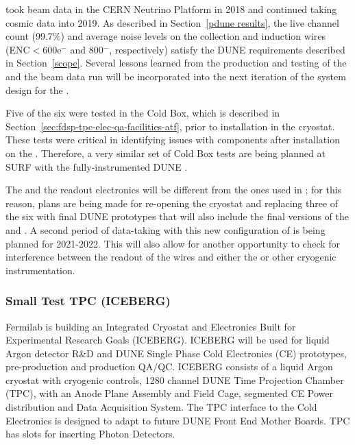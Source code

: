  took beam data in the CERN Neutrino Platform in 2018 and continued taking cosmic data 
into 2019. As described in Section~\ref{pdune results}, the live channel count (99.7\%) and average noise
levels on the collection and induction wires (ENC$<$600e$^-$ and 800$^-$, respectively) satisfy the DUNE
\single requirements described in Section~\ref{scope}. Several lessons learned from the production 
and testing of the  and the 
beam data run will be incorporated into the next iteration of the system design for the .

Five of the six were tested in the  Cold Box, which is described in
Section~\ref{sec:fdsp-tpc-elec-qa-facilities-atf}, prior to installation in the cryostat. These tests
were critical in identifying issues with  components after installation on the . 
Therefore, a very similar set of Cold Box tests are being planned at SURF with the fully-instrumented
DUNE \single {}.

The  and the readout electronics will be different from the ones used in ; for 
this reason, plans are being made for re-opening the  cryostat and replacing three of the 
six  with final DUNE prototypes that will also include the final versions of the 
 and . A second period of data-taking with this new configuration of 
 is being planned for 2021-2022. This will also allow for another opportunity to check 
for interference between the readout of the  wires and either the  or other
cryogenic instrumentation.

\subsubsection{Small Test TPC (ICEBERG)}
\label{sec:fdsp-tpcelec-qa-facilities-testtpc}

Fermilab is building an Integrated Cryostat and Electronics Built for Experimental Research Goals (ICEBERG). ICEBERG will be used for liquid Argon detector R\&D and DUNE Single Phase Cold Electronics (CE) prototypes, pre-production and production QA/QC. ICEBERG consists of a liquid Argon cryostat with cryogenic controls, 1280 channel DUNE Time Projection Chamber (TPC), with an Anode Plane Assembly and Field Cage, segmented CE Power distribution and Data Acquisition System. The TPC interface to the Cold Electronics is designed to adapt to future DUNE Front End Mother Boards. TPC has slots for inserting Photon Detectors.

